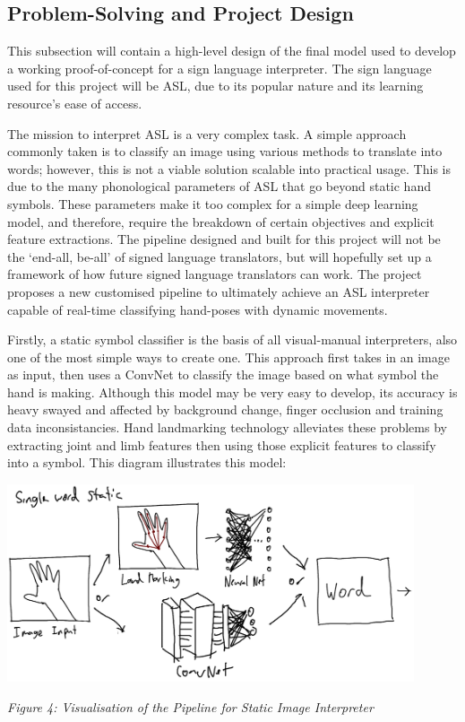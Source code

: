 \documentclass[11pt]{article}
\begin{document}
    \subsection{Problem-Solving and Project Design}
        This subsection will contain a high-level design of the final model used to develop a working proof-of-concept for a sign language interpreter. The sign language used for this project will be ASL, due to its popular nature and its learning resource's ease of access. 

        The mission to interpret ASL is a very complex task. A simple approach commonly taken is to classify an image using various methods to translate into words; however, this is not a viable solution scalable into practical usage. This is due to the many phonological parameters of ASL that go beyond static hand symbols. These parameters make it too complex for a simple deep learning model, and therefore, require the breakdown of certain objectives and explicit feature extractions. The pipeline designed and built for this project will not be the `end-all, be-all' of signed language translators, but will hopefully set up a framework of how future signed language translators can work. The project proposes a new customised pipeline to ultimately achieve an ASL interpreter capable of real-time classifying hand-poses with dynamic movements. 

        Firstly, a static symbol classifier is the basis of all visual-manual interpreters, also one of the most simple ways to create one. This approach first takes in an image as input, then uses a ConvNet to classify the image based on what symbol the hand is making. Although this model may be very easy to develop, its accuracy is heavy swayed and affected by background change, finger occlusion and training data inconsistancies. Hand landmarking technology alleviates these problems by extracting joint and limb features then using those explicit features to classify into a symbol. This diagram illustrates this model:

        \begin{center}
            \includegraphics[width=12cm]{images/staticModel.png}
            \\
            \raggedright \textit{
            Figure 4: Visualisation of the Pipeline for Static Image Interpreter
            }
        \end{center}
\end{document}
